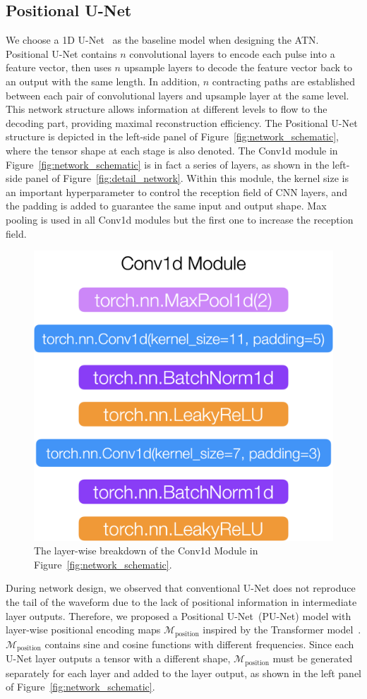 \subsection{Positional U-Net}
We choose a 1D U-Net~\cite{UNet} as the baseline model when designing the ATN. Positional U-Net contains $n$ convolutional layers to encode each pulse into a feature vector, then uses $n$ upsample layers to decode the feature vector back to an output with the same length. In addition, $n$ contracting paths are established between each pair of convolutional layers and upsample layer at the same level. This network structure allows information at different levels to flow to the decoding part, providing maximal reconstruction efficiency. The Positional U-Net structure is depicted in the left-side panel of Figure~\ref{fig:network_schematic}, where the tensor shape at each stage is also denoted. The Conv1d module in Figure~\ref{fig:network_schematic} is in fact a series of layers, as shown in the left-side panel of Figure~\ref{fig:detail_network}. Within this module, the kernel size is an important hyperparameter to control the reception field of CNN layers, and the padding is added to guarantee the same input and output shape. Max pooling is used in all Conv1d modules but the first one to increase the reception field. 
\begin{figure}[htb!]
    \centering
    \includegraphics[width=0.3\linewidth,trim={0pc 0pc 0pc 0pc},clip]{ch5/figs/conv1d.png}
    \caption{The layer-wise breakdown of the Conv1d Module in Figure~\ref{fig:network_schematic}.}
    \label{fig:cov1d_break_down}
\end{figure}

During network design, we observed that conventional U-Net does not reproduce the tail of the waveform due to the lack of positional information in intermediate layer outputs. Therefore, we proposed a Positional U-Net~(PU-Net) model with layer-wise positional encoding maps $\mathcal{M}_{\mathrm{position}}$ inspired by the Transformer model~\cite{Transformer}. $\mathcal{M}_{\mathrm{position}}$ contains sine and cosine functions with different frequencies. Since each U-Net layer outputs a tensor with a different shape, $\mathcal{M}_{\mathrm{position}}$ must be generated separately for each layer and added to the layer output, as shown in the left panel of Figure~\ref{fig:network_schematic}. 

